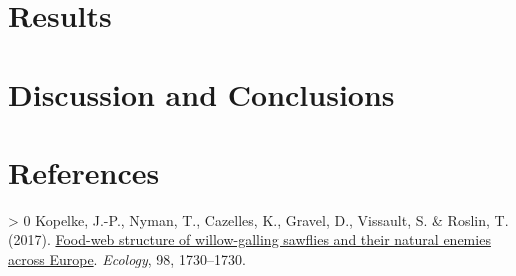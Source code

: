 \documentclass[11pt]{article}
\newlength{\cslhangindent}
\newenvironment{CSLReferences}[3] %
 {%
  \setlength{\parindent}{0pt}
  \ifodd #1 \everypar{\setlength{\hangindent}{\cslhangindent}}\ignorespaces\fi
  \ifnum #2 > 0
  \setlength{\parskip}{#2\baselineskip}
  \fi
 }%
 {}
\begin{document}
\hypertarget{results}{%
\section{Results}\label{results}}

\hypertarget{discussion-and-conclusions}{%
\section{Discussion and Conclusions}\label{discussion-and-conclusions}}

\hypertarget{references}{%
\section*{References}\label{references}}

\hypertarget{refs}{}
\begin{CSLReferences}{1}{0}
\leavevmode{}%
Kopelke, J.-P., Nyman, T., Cazelles, K., Gravel, D., Vissault, S. \&
Roslin, T. (2017). \href{https://doi.org/10.1002/ecy.1832}{Food-web
structure of willow-galling sawflies and their natural enemies across
Europe}. \emph{Ecology}, 98, 1730--1730.

\end{CSLReferences}
\end{document}
